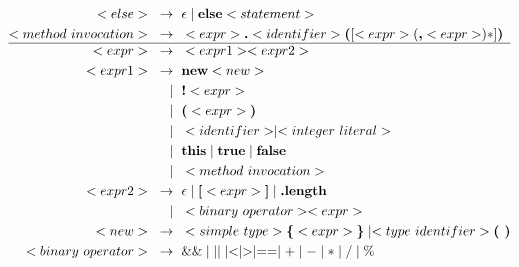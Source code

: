 \documentclass[a4paper,12pt]{article}
\newcommand{\bb}[1]{\textbf{#1}}
\newcommand{\s}{\text{ }}
\newcommand{\bracel}{\textbraceleft}
\newcommand{\bracer}{\textbraceright}
\begin{document}
\begin{align*}
<else>\s \to \s &\epsilon \mid \bb{else} <statement> \\
<method\s invocation>\s \to \s &<expr> \bb{.} <identifier> \bb{(} [ <expr> (\bb{,} <expr>)* ] \bb{)} \\
\hline
<expr>\s \to \s &<expr1><expr2> \\
<expr1>\s \to \s &\bb{new} <new>\\
    \mid \s    &\bb{!} <expr> \\
    \mid \s    &\bb{(} <expr> \bb{)} \\
    \mid \s    &<identifier> \mid <integer\s literal> \\
    \mid \s    &\bb{this} \mid \bb{true} \mid \bb{false} \\
    \mid \s    &<method\s invocation> \\
<expr2>\s \to \s &\epsilon \mid \bb{[} <expr> \bb{]} \mid \bb{.length}\\
    \mid \s    &<binary\s operator> <expr> \\
<new>\s \to \s &<simple\s type> \bb{\bracel} <expr> \bb{\bracer} \mid <type\s identifier> \bb{( )} \\ 
<binary\s operator>\s \to \s & \&\& \mid || \mid < \mid > \mid == \mid + \mid - \mid * \mid / \mid \% 
\end{align*}
\end{document}
